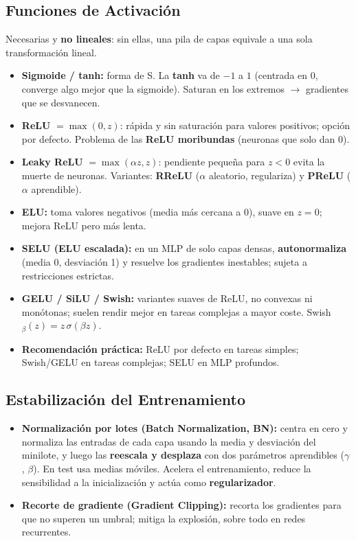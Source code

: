 \documentclass[12pt]{book} %
\providecommand{\tightlist}{%
  \setlength{\itemsep}{0pt}\setlength{\parskip}{0pt}}
\begin{document}
\hypertarget{funciones-de-activaciuxf3n}{%
\subsection{Funciones de Activación}\label{funciones-de-activaciuxf3n}}

Necesarias y \textbf{no lineales}: sin ellas, una pila de capas equivale
a una sola transformación lineal.

\begin{itemize}
\tightlist
\item
  \textbf{Sigmoide / tanh:} forma de S. La \textbf{tanh} va de \(-1\) a
  \(1\) (centrada en 0, converge algo mejor que la sigmoide). Saturan en
  los extremos \(\to\) gradientes que se desvanecen.
\item
  \textbf{ReLU} \(=\max(0,z)\): rápida y sin saturación para valores
  positivos; opción por defecto. Problema de las \textbf{ReLU
  moribundas} (neuronas que solo dan 0).
\item
  \textbf{Leaky ReLU} \(=\max(\alpha z, z)\): pendiente pequeña para
  \(z<0\) evita la muerte de neuronas. Variantes: \textbf{RReLU}
  (\(\alpha\) aleatorio, regulariza) y \textbf{PReLU} (\(\alpha\)
  aprendible).
\item
  \textbf{ELU:} toma valores negativos (media más cercana a 0), suave en
  \(z=0\); mejora ReLU pero más lenta.
\item
  \textbf{SELU (ELU escalada):} en un MLP de solo capas densas,
  \textbf{autonormaliza} (media 0, desviación 1) y resuelve los
  gradientes inestables; sujeta a restricciones estrictas.
\item
  \textbf{GELU / SiLU / Swish:} variantes suaves de ReLU, no convexas ni
  monótonas; suelen rendir mejor en tareas complejas a mayor coste.
  Swish\(_\beta(z)=z\,\sigma(\beta z)\).
\item
  \textbf{Recomendación práctica:} ReLU por defecto en tareas simples;
  Swish/GELU en tareas complejas; SELU en MLP profundos.
\end{itemize}

\hypertarget{estabilizaciuxf3n-del-entrenamiento}{%
\subsection{Estabilización del
Entrenamiento}\label{estabilizaciuxf3n-del-entrenamiento}}

\begin{itemize}
\tightlist
\item
  \textbf{Normalización por lotes (Batch Normalization, BN):} centra en
  cero y normaliza las entradas de cada capa usando la media y
  desviación del minilote, y luego las \textbf{reescala y desplaza} con
  dos parámetros aprendibles (\(\gamma\), \(\beta\)). En test usa medias
  móviles. Acelera el entrenamiento, reduce la sensibilidad a la
  inicialización y actúa como \textbf{regularizador}.
\item
  \textbf{Recorte de gradiente (Gradient Clipping):} recorta los
  gradientes para que no superen un umbral; mitiga la explosión, sobre
  todo en redes recurrentes.
\end{itemize}
\end{document}
